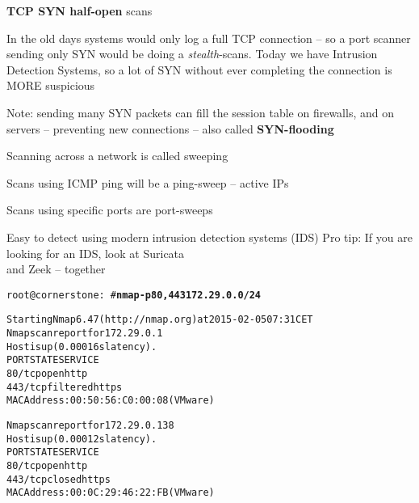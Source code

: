 \documentclass[Screen16to9,17pt]{foils}
\begin{document}


\begin{list2}
\item {\bfseries TCP SYN half-open} scans
\item In the old days systems would only log a full TCP connection
  -- so a port scanner sending only SYN would be doing a \emph{stealth}-scans. Today we have Intrusion Detection Systems, so a lot of SYN without ever completing the connection is MORE suspicious
\item Note: sending many SYN packets can fill the session table on firewalls, and on servers -- preventing new connections -- also called {\bfseries SYN-flooding}
\end{list2}



\begin{list1}
\item Scanning across a network is called sweeping
\item Scans using ICMP ping will be a ping-sweep -- active IPs
\item Scans using specific ports are port-sweeps
\item Easy to detect using modern intrusion detection systems (IDS)
\vskip 2cm
Pro tip: If you are looking for an IDS, look at Suricata \\
and Zeek  -- together
\end{list1}


\begin{alltt}\small
root@cornerstone:~#{\bfseries  nmap -p80,443 172.29.0.0/24}

Starting Nmap 6.47 ( http://nmap.org ) at 2015-02-05 07:31 CET
Nmap scan report for 172.29.0.1
Host is up (0.00016s latency).
PORT    STATE    SERVICE
{\color{darkgreen}80/tcp  open     http}
443/tcp filtered https
MAC Address: 00:50:56:C0:00:08 (VMware)

Nmap scan report for 172.29.0.138
Host is up (0.00012s latency).
PORT    STATE  SERVICE
{\color{darkgreen}80/tcp  open   http}
443/tcp closed https
MAC Address: 00:0C:29:46:22:FB (VMware)

\end{alltt}

\end{document}
